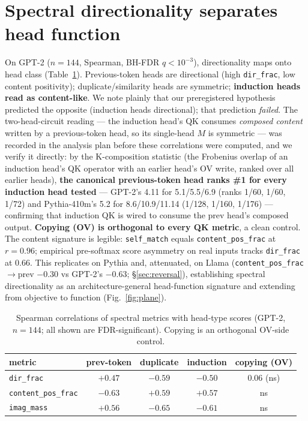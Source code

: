 \documentclass[11pt]{article}
\newcommand{\dirfrac}{\texttt{dir\_frac}\xspace}
\newcommand{\contentpos}{\texttt{content\_pos\_frac}\xspace}
\newcommand{\imagmass}{\texttt{imag\_mass}\xspace}
\newcommand{\selfmatch}{\texttt{self\_match}\xspace}
\newcommand{\M}{\ensuremath{M}\xspace}
\begin{document}
\section{Spectral directionality separates head function}\label{sec:descriptive}
On GPT-2 ($n{=}144$, Spearman, BH-FDR $q{<}10^{-3}$), directionality maps onto head class (Table~\ref{tab:taxonomy}).
Previous-token heads are directional (high \dirfrac, low content positivity); duplicate/similarity heads are symmetric;
\textbf{induction heads read as content-like}. We note plainly that our preregistered hypothesis predicted the
opposite (induction heads directional); that prediction \emph{failed}. The two-head-circuit reading --- the induction
head's QK consumes \emph{composed content} written by a previous-token head, so its single-head \M is symmetric ---
was recorded in the analysis plan before these correlations were computed, and we verify it directly:
by the K-composition statistic (the Frobenius overlap of an induction head's QK operator with an earlier head's OV
write, ranked over all earlier heads), \textbf{the canonical previous-token head ranks \#1 for every induction head
tested} --- GPT-2's 4.11 for 5.1/5.5/6.9 (ranks 1/60, 1/60, 1/72) and Pythia-410m's 5.2 for 8.6/10.9/11.14 (1/128,
1/160, 1/176) --- confirming that induction QK is wired to consume the prev head's composed output. \textbf{Copying (OV) is orthogonal to every QK metric}, a clean control. The content
signature is legible: \selfmatch equals \contentpos at $r{=}0.96$; empirical pre-softmax score asymmetry on real
inputs tracks \dirfrac at $0.66$. This replicates on Pythia and, attenuated, on Llama (\contentpos$\to$prev $-0.30$
vs GPT-2's $-0.63$; \S\ref{sec:reversal}), establishing spectral directionality as an architecture-general
head-function signature and extending \citet{saponati2025} from objective to function (Fig.~\ref{fig:plane}).

\begin{table}[t]\centering\small
\begin{tabular}{lcccc}\toprule
metric & prev-token & duplicate & induction & copying (OV)\\\midrule
\dirfrac      & $+0.47$ & $-0.59$ & $-0.50$ & $0.06$ (ns)\\
\contentpos   & $-0.63$ & $+0.59$ & $+0.57$ & ns\\
\imagmass     & $+0.56$ & $-0.65$ & $-0.61$ & ns\\
\bottomrule\end{tabular}
\caption{Spearman correlations of spectral metrics with head-type scores (GPT-2, $n{=}144$; all shown are
FDR-significant). Copying is an orthogonal OV-side control.}
\label{tab:taxonomy}
\end{table}
\end{document}

